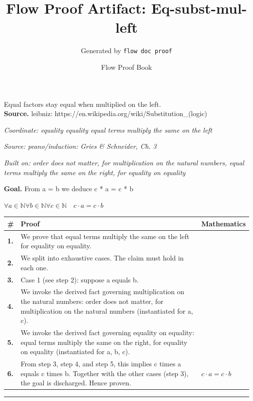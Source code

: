 \documentclass[11pt]{article}
\title{Flow Proof Artifact: Eq-subst-mul-left}
\author{Generated by \texttt{flow doc proof}}
\date{Flow Proof Book}
\theoremstyle{definition}
\begin{document}
\maketitle
Equal factors stay equal when multiplied on the left.\\[0.5em]
\textbf{Source.} leibniz: https://en.wikipedia.org/wiki/Substitution\_(logic)\\[0.5em]
\bigskip
{}\par
\smallskip\noindent\textit{Coordinate: equality \cdot equality \cdot equal terms multiply the same on the left}\par
\smallskip\noindent\textit{Source: peano/induction: Gries \& Schneider, Ch. 3}\par
\smallskip\noindent\textit{Built on: order does not matter, for multiplication on the natural numbers, equal terms multiply the same on the right, for equality on equality}\par
\medskip
\noindent\textbf{Goal.} From a = b we deduce c * a = c * b\par
\noindent$\displaystyle \forall a \in \mathbb{N} \forall b \in \mathbb{N} \forall c \in \mathbb{N}\quad c \cdot a = c \cdot b$\par
\medskip
\noindent
\begin{tabular}{@{} >{\raggedright\arraybackslash}p{} >{\raggedright\arraybackslash}p{} >{\raggedleft\arraybackslash}p{} @{}}
\textbf{\#} & \textbf{Proof} & \textbf{Mathematics} \\
\midrule
\textbf{1.} & We prove that equal terms multiply the same on the left for equality on equality. & \\[0.45em]
\textbf{2.} & We split into exhaustive cases. The claim must hold in each one. & \\[0.45em]
\textbf{3.} & Case 1 (see step 2): suppose a  equals  b. & \\[0.45em]
\textbf{4.} & We invoke the derived fact governing multiplication on the natural numbers: order does not matter, for multiplication on the natural numbers (instantiated for a, c). & \\[0.45em]
\textbf{5.} & We invoke the derived fact governing equality on equality: equal terms multiply the same on the right, for equality on equality (instantiated for a, b, c). & \\[0.45em]
\textbf{6.} & From step 3, step 4, and step 5, this implies c times a equals c times b. Together with the other cases (step 3), the goal is discharged. Hence proven. & $\displaystyle c \cdot a = c \cdot b$ \\[0.45em]
\bottomrule
\end{tabular}
\label{thm:Eq-equality-equal_terms_multiply_the_same_on_the_left}
\par\medskip\hrule
\end{document}
